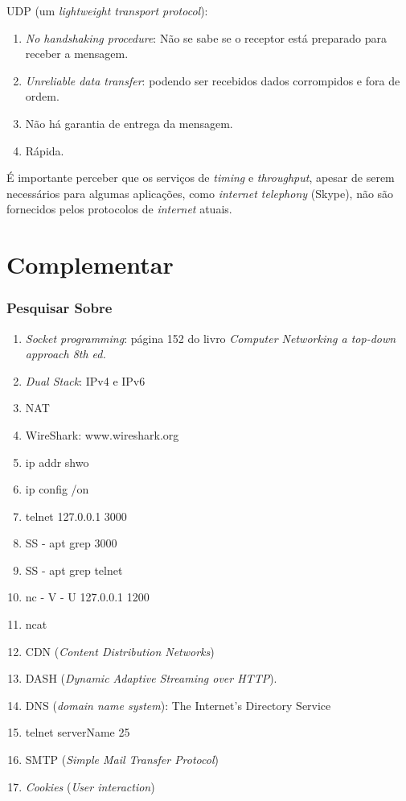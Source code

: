 UDP (um \emph{lightweight transport protocol}):

\begin{enumerate}
\def\labelenumi{\arabic{enumi}.}
\tightlist
\item
  \emph{No handshaking procedure}: Não se sabe se o receptor está
  preparado para receber a mensagem.
\item
  \emph{Unreliable data transfer}: podendo ser recebidos dados
  corrompidos e fora de ordem.
\item
  Não há garantia de entrega da mensagem.
\item
  Rápida.
\end{enumerate}

É importante perceber que os serviços de \emph{timing} e
\emph{throughput}, apesar de serem necessários para algumas aplicações,
como \emph{internet telephony} (Skype), não são fornecidos pelos
protocolos de \emph{internet} atuais.

\hypertarget{complementar-3}{%
\section{Complementar}\label{complementar-3}}

\hypertarget{pesquisar-sobre-2}{%
\subsubsection{Pesquisar Sobre}\label{pesquisar-sobre-2}}

\begin{enumerate}
\def\labelenumi{\arabic{enumi}.}
\tightlist
\item
  \emph{Socket programming}: página 152 do livro \emph{Computer
  Networking a top-down approach 8th ed.}
\item
  \emph{Dual Stack}: IPv4 e IPv6
\item
  NAT
\item
  WireShark: www.wireshark.org
\item
  ip addr shwo
\item
  ip config /on
\item
  telnet 127.0.0.1 3000
\item
  SS - apt \textbar{} grep 3000
\item
  SS - apt \textbar{} grep telnet
\item
  nc - V - U 127.0.0.1 1200
\item
  ncat
\item
  CDN (\emph{Content Distribution Networks})
\item
  DASH (\emph{Dynamic Adaptive Streaming over HTTP}).
\item
  DNS (\emph{domain name system}): The Internet's Directory Service
\item
  telnet serverName 25
\item
  SMTP (\emph{Simple Mail Transfer Protocol})
\item
  \emph{Cookies} (\emph{User interaction})
\end{enumerate}
